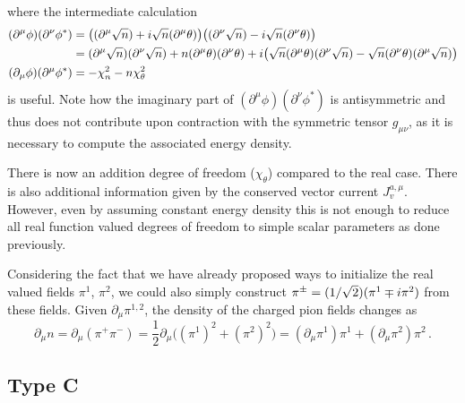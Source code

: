 where the intermediate calculation
\begin{subequations}
    \begin{align}
        (\partial^\mu\phi)(\partial^\nu\phi^*)&=\big((\partial^\mu\sqrt{n})+{i}\sqrt{n}(\partial^\mu\theta)\big)\big((\partial^\nu\sqrt{n})-{i}\sqrt{n}(\partial^\nu\theta)\big)\\
        &=(\partial^\mu\sqrt{n})(\partial^\nu\sqrt{n})+n(\partial^\mu\theta)(\partial^\nu\theta)+{i}\big(\sqrt{n}(\partial^\mu\theta)(\partial^\nu\sqrt{n})-\sqrt{n}(\partial^\nu\theta)(\partial^\mu\sqrt{n})\big)\\
        (\partial_\mu\phi)(\partial^\mu\phi^*)&=-\chi_n^2-n\chi_\theta^2
    \end{align}
\end{subequations}
is useful. Note how the imaginary part of ${(\partial^\mu\phi)(\partial^\nu\phi^*)}$ is antisymmetric and thus does not contribute upon contraction with the symmetric tensor ${g_{\mu\nu}}$, as it is necessary to compute the associated energy density.

There is now an addition degree of freedom ($\chi_\theta$) compared to the real case. There is also additional information given by the conserved vector current $J_v^{a,\mu}$. However, even by assuming constant energy density this is not enough to reduce all real function valued degrees of freedom to simple scalar parameters as done previously.

Considering the fact that we have already proposed ways to initialize the real valued fields $\pi^1$, $\pi^2$, we could also simply construct $\pi^\pm=(1/\sqrt{2})(\pi^1\mp{i}\pi^2)$ from these fields. Given $\partial_\mu\pi^{1,2}$, the density of the charged pion fields changes as
\begin{equation}
    \partial_\mu n=\partial_\mu(\pi^+\pi^-)=\frac{1}{2}\partial_\mu\big((\pi^1)^2+(\pi^2)^2\big)=(\partial_\mu\pi^1)\pi^1+(\partial_\mu\pi^2)\pi^2\,.
\end{equation}

\subsection{Type C}

